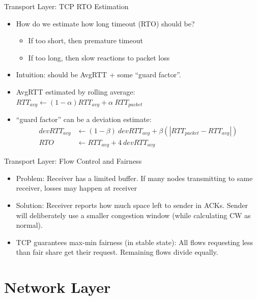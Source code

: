\documentclass{beamer}
\begin{document}
\begin{frame}[t]{Transport Layer: TCP RTO Estimation}
    \begin{itemize}
        \item How do we estimate how long timeout (RTO) should be?
        \begin{itemize}
            \item \pause If too short, then premature timeout
            \item If too long, then slow reactions to packet loss
        \end{itemize}
        \item \pause \alert{Intuition}: should be AvgRTT + some ``guard factor''.
        \item \pause AvgRTT estimated by rolling average: $RTT_{avg} \gets (1-\alpha) RTT_{avg} + \alpha\> RTT_{packet}$
        \item \pause ``guard factor'' can be a deviation estimate: \begin{align*}
            devRTT_{avg} &\gets (1-\beta)\> devRTT_{avg} + \beta (|RTT_{packet} - RTT_{avg}|)\\
            RTO &\gets RTT_{avg} + 4\>devRTT_{avg}
        \end{align*}
    \end{itemize}
\end{frame}

\begin{frame}[t]{Transport Layer: Flow Control and Fairness}
    \begin{itemize}
        \item \alert{Problem}: Receiver has a limited buffer. If many nodes transmitting to same receiver, losses may happen at receiver
        \item \pause \alert{Solution}: Receiver reports how much space left to sender in ACKs. Sender will deliberately use a smaller congestion window (while calculating CW as normal).
        \vspace{1cm}
        \item \pause TCP guarantees \alert{max-min fairness} (in stable state): All flows requesting less than fair share get their request. Remaining flows divide equally.
    \end{itemize}
\end{frame}

\section{Network Layer}
\end{document}
